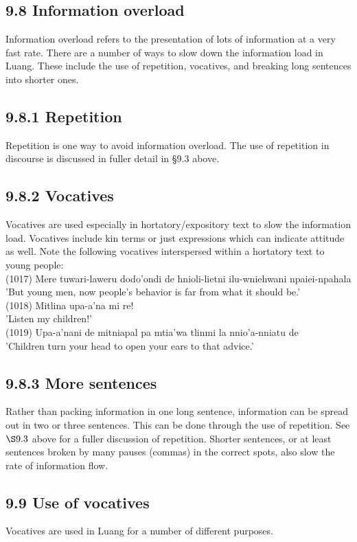 \documentclass[10pt]{article}
\begin{document}
\subsection*{9.8 Information overload}
Information overload refers to the presentation of lots of information at a very fast rate. There are a number of ways to slow down the information load in Luang. These include the use of repetition, vocatives, and breaking long sentences into shorter ones.

\subsection*{9.8.1 Repetition}
Repetition is one way to avoid information overload. The use of repetition in discourse is discussed in fuller detail in §9.3 above.

\subsection*{9.8.2 Vocatives}
Vocatives are used especially in hortatory/expository text to slow the information load. Vocatives include kin terms or just expressions which can indicate attitude as well. Note the following vocatives interspersed within a hortatory text to young people:\\
(1017) Mere tuwari-laweru dodo'ondi de hnioli-lietni ilu-wniehwani npaiei-npahala\\
'But young men, now people's behavior is far from what it should be.'\\
(1018) Mitlina upa-a'na mi re!\\
'Listen my children!'\\
(1019) Upa-a'nani de mitniapal pa mtia'wa tlinmi la nnio'a-nniatu de\\
'Children turn your head to open your ears to that advice.'

\subsection*{9.8.3 More sentences}
Rather than packing information in one long sentence, information can be spread out in two or three sentences. This can be done through the use of repetition. See \(\S 9.3\) above for a fuller discussion of repetition. Shorter sentences, or at least sentences broken by many pauses (commas) in the correct spots, also slow the rate of information flow.

\subsection*{9.9 Use of vocatives}
Vocatives are used in Luang for a number of different purposes.
\end{document}
